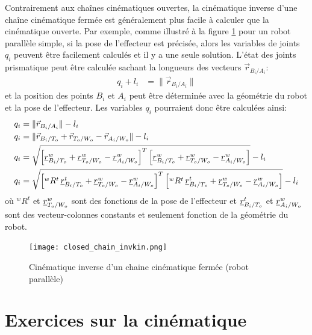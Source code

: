 Contrairement aux chaînes cinématiques ouvertes, la cinématique inverse d'une chaîne cinématique fermée est généralement plus facile à calculer que la cinématique ouverte. Par exemple, comme illustré à la figure \ref{fig:closed_chain_invkin} pour un robot parallèle simple, si la pose de l'effecteur est précisée, alors les variables de joints $q_i$ peuvent être facilement calculés et il y a une seule solution. L'état des joints prismatique peut être calculée sachant la longueurs des vecteurs $\vec{r}_{B_i/A_i}$:
\begin{align}
q_i + l_i &= \| \vec{r}_{B_i/A_i} \|
\end{align} 
et la position des points $B_i$ et $A_i$ peut être déterminée avec la géométrie du robot et la pose de l'effecteur. Les variables $q_i$ pourraient donc être calculées ainsi:
\begin{align}
q_i &= \| \vec{r}_{B_i/A_i} \| - l_i \\
q_i &= \| \vec{r}_{B_i/T_o} +  \vec{r}_{T_o/W_o} - \vec{r}_{A_i/W_o} \| - l_i \\
q_i &= \sqrt{\left[  \underline{r}_{B_i/T_o}^w + \underline{r}_{T_o/W_o}^w - \underline{r}_{A_i/W_o}^w
\right]^T \left[  \underline{r}_{B_i/T_o}^w + \underline{r}_{T_o/W_o}^w - \underline{r}_{A_i/W_o}^w
\right]} - l_i \\
q_i &= \sqrt{\left[  {}^wR^t \, \underline{r}_{B_i/T_o}^t + \underline{r}_{T_o/W_o}^w - \underline{r}_{A_i/W_o}^w
\right]^T \left[  {}^wR^t \, \underline{r}_{B_i/T_o}^t + \underline{r}_{T_o/W_o}^w - \underline{r}_{A_i/W_o}^w \right]} - l_i
\end{align} 
où ${}^wR^t$ et $\underline{r}_{T_o/W_o}^w$ sont des fonctions de la pose de l'effecteur et $\underline{r}_{B_i/T_o}^t$ et $\underline{r}_{A_i/W_o}^w$ sont des vecteur-colonnes constants et seulement fonction de la géométrie du robot. 

\begin{figure}[H]
	\centering
		\texttt{[image: closed\_chain\_invkin.png]}
	\caption{Cinématique inverse d'un chaine cinématique fermée (robot parallèle)}
	\label{fig:closed_chain_invkin}
\end{figure}




\newpage
\section{Exercices sur la cinématique}


